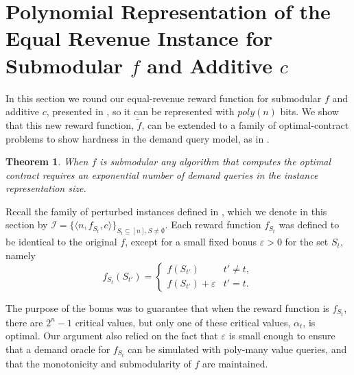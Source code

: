 \documentclass[11pt]{article}
\newtheorem{theorem}{Theorem}
\newcommand{\eps}{\varepsilon}
\newcommand{\I}{\mathcal{I}}
\newcommand{\inst}[3]{\langle #1, #2, #3 \rangle}
\newcommand{\tf}{\tilde{f}}
\begin{document}
\section{Polynomial Representation of the Equal Revenue Instance for Submodular $f$ and Additive $c$}\label{apx:rounded}

\newcommand{\tn}{\theta(n^2)}
\DeclarePairedDelimiter{\floor}{\lfloor}{\rfloor}
\newcommand{\famI}{\I = \{ \inst{n}{f_{S_t}}{c} \}_{S_t \subseteq [n],S \ne \emptyset}}

In this section we round our equal-revenue reward function for submodular $f$ and additive $c$, presented in , so it can be represented with $poly(n)$ bits.
We show that this new reward function, $\tf$, can be extended to a family of optimal-contract problems to show hardness in the demand query model, as in .

\begin{theorem}\label{thm:PolyRepr}
    When $f$ is submodular any algorithm that computes the optimal contract requires an exponential number of demand queries in the instance representation size. 
\end{theorem} 

Recall the family of perturbed instances defined in , which we denote in this section by $\famI$.
Each reward function $f_{S_t}$ was defined to be identical to the original $f$, except for a small fixed bonus $\eps > 0 $ for the set $S_t$, namely 
\begin{equation}\label{eq:fS}
f_{S_t}(S_{t'}) = \begin{cases}
    f(S_{t'}) & t' \ne t, \\
    f(S_{t'}) + \eps & t' = t.
\end{cases}    
\end{equation}

The purpose of the bonus was to guarantee that
when the reward function is $f_{S_t}$, there are $2^n-1$ critical values, but only one of these critical values, $\alpha_t$, is optimal. 
Our argument also relied on the fact that $\eps$ is small enough to ensure that a demand oracle for $f_{S_t}$ can be simulated with poly-many value queries, and that the monotonicity and submodularity of $f$ are maintained.
\end{document}
